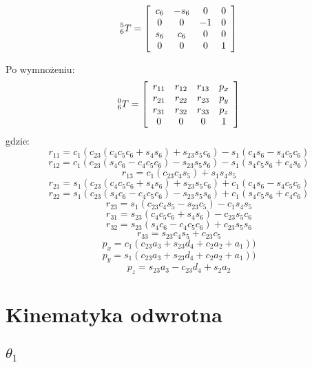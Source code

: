 \documentclass[]{article}
\begin{document}
\[\prescript{5}{6}{T}=\begin{bmatrix}
\begin{array}{cccc}
c_6 & -s_6 & 0 & 0 \\
0 & 0 & -1 & 0 \\
s_6 & c_6 & 0 & 0 \\
0 & 0 & 0 & 1 \\
\end{array}
\end{bmatrix}
\]

Po wymnożeniu:
\[\prescript{0}{6}{T}=\begin{bmatrix}
\begin{array}{cccc}
r_{11} & r_{12} & r_{13} & p_x \\
r_{21} & r_{22} & r_{23} & p_y \\
r_{31} & r_{32} & r_{33} & p_z \\
0 & 0 & 0 & 1 \\
\end{array}
\end{bmatrix}
\]
gdzie:
\[ r_{11} = c_1(c_{23}(c_4c_5c_6 + s_4s_6) + s_{23}s_5c_6) - s_1(c_4s_6 -s_4c_5c_6)\]
\[ r_{12} = c_1(c_{23}(s_4c_6 - c_4c_5c_6) - s_{23}s_5s_6) - s_1(s_4c_5s_6 + c_4s_6)\]
\[ r_{13} = c_1(c_{23}c_4s_5) + s_1s_4s_5\]
\[ r_{21} = s_1(c_{23}(c_4c_5c_6 + s_4s_6) + s_{23}s_5c_6) + c_1(c_4s_6 -s_4c_5c_6 )\]
\[ r_{22} = s_1(c_{23}(s_4c_6 - c_4c_5c_6) - s_{23}s_5s_6) + c_1(s_4c_5s_6 + c_4c_6)\]
\[ r_{23} = s_1(c_{23}c_4s_5 - s_{23}c_5) - c_1s_4s_5\]
\[ r_{31} = s_{23}(c_4c_5c_6 + s_4s_6) - c_{23}s_5c_6\]
\[ r_{32} = s_{23}(s_4c_6 - c_4c_5c_6) + c_{23}s_5s_6\]
\[ r_{33} = s_{23}c_4s_5 + c_{23}c_5\] 
\[ p_x = c_1(c_{23}a_3 + s_{23}d_4 + c_2a_2 + a_1))\] 
\[ p_y = s_1(c_{23}a_3 + s_{23}d_4 + c_2a_2 + a_1))\]
\[ p_z = s_{23}a_3 - c_{23}d_4 + s_2a_2 \]

\section{Kinematyka odwrotna}
\subsection{$\theta_1$}
\end{document}
